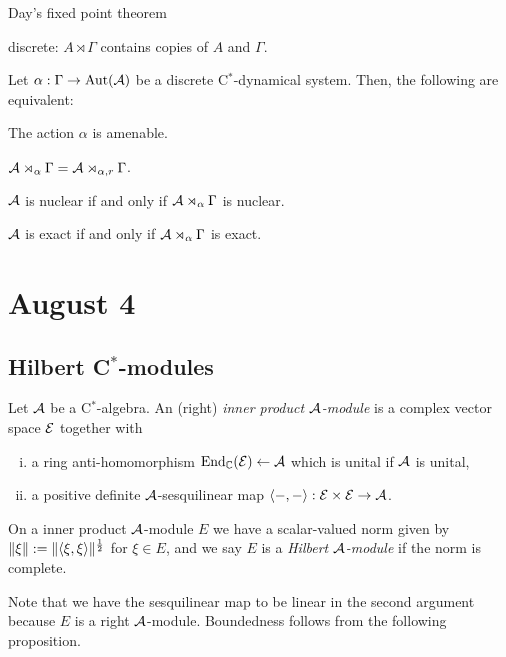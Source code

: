 \documentclass{../../small}
\begin{document}
Day's fixed point theorem

discrete: $A\rtimes\Gamma$ contains copies of $A$ and $\Gamma$.

\begin{thm}
Let $\alpha:\Gamma\to\operatorname{Aut}(\mathcal{A})$ be a discrete C$^*$-dynamical system.
Then, the following are equivalent:
\begin{parts}
\item The action $\alpha$ is amenable.
\item $\mathcal{A}\rtimes_\alpha\Gamma=\mathcal{A}\rtimes_{\alpha,r}\Gamma$.
\item $\mathcal{A}$ is nuclear if and only if $\mathcal{A}\rtimes_\alpha\Gamma$ is nuclear.
\item $\mathcal{A}$ is exact if and only if $\mathcal{A}\rtimes_\alpha\Gamma$ is exact.
\end{parts}
\end{thm}
\fi


\newpage
\section{August 4}

\subsection{Hilbert C$^*$-modules}

\begin{defn}
Let $\mathcal{A}$ be a C$^*$-algebra.
An (right) \emph{inner product $\mathcal{A}$-module} is a complex vector space $\mathcal{E}$ together with
\begin{enumerate}[(i)]
\item
a ring anti-homomorphism $\operatorname{End}_{\mathbb{C}}(\mathcal{E})\leftarrow\mathcal{A}$ which is unital if $\mathcal{A}$ is unital,
\item
a positive definite $\mathcal{A}$-sesquilinear map $\langle-,-\rangle:\mathcal{E}\times\mathcal{E}\to\mathcal{A}$.
\end{enumerate}
On a inner product $\mathcal{A}$-module $E$ we have a scalar-valued norm given by $\|\xi\|:=\|\langle\xi,\xi\rangle\|^{\frac12}$ for $\xi\in E$, and we say $E$ is a \emph{Hilbert $\mathcal{A}$-module} if the norm is complete.
\end{defn}

Note that we have the sesquilinear map to be linear in the second argument because $E$ is a right $\mathcal{A}$-module.
Boundedness follows from the following proposition.
\end{document}
